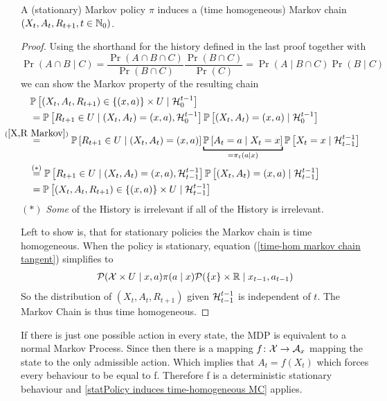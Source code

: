 \begin{prop}\label{statPolicy induces time-homogeneous MC}
	A (stationary) Markov  policy \(\pi\) induces a (time homogeneous) Markov chain \((X_t,A_t,R_{t+1},t\in\mathbb{N}_0)\).
\end{prop}
\begin{proof} 

	Using the shorthand for the history defined in the last proof together with 
	\[
		\Pr(A\cap B \mid C)
		=\frac{\Pr(A\cap B\cap C)}{\Pr(B\cap C)}\frac{\Pr(B\cap C)}{\Pr(C)} 
		= \Pr(A\mid B\cap C)\Pr(B\mid C) 
	\]
	we can show the Markov property of the resulting chain
	\begin{align}
		&\Pr\left[(X_t,A_t,R_{t+1})\in\{(x,a)\}\times U \mid \cH_0^{t-1} \right] \nonumber \\
		&=\Pr\left[R_{t+1}\in U \mid (X_t, A_t)=(x,a), \cH_0^{t-1}\right]
		\Pr\left[(X_t, A_t)=(x,a)\mid\cH_0^{t-1}\right]
		\nonumber\\
		&\lxeq{(\ref{X,R Markov})}\Pr\left[R_{t+1}\in U \mid (X_t, A_t)=(x,a)\right]
		\underbracket[1pt]{\Pr\left[A_t=a \mid X_t=x\right]}_{=\pi_t(a\mid x)}
		\Pr\left[X_t=x\mid \cH_{t-1}^{t-1}\right]
		\label{time-hom markov chain tangent}\\
		&\lxeq{(*)}\Pr\left[R_{t+1}\in U \mid (X_t, A_t)=(x,a), \cH_{t-1}^{t-1}\right]
		\Pr\left[(X_t, A_t)=(x,a)\mid\cH_{t-1}^{t-1}\right]
		\nonumber\\
		&=\Pr\left[(X_t,A_t,R_{t+1})\in\{(x,a)\}\times U \mid \cH_{t-1}^{t-1} \right]
		\nonumber
	\end{align}
	\((*)\) \emph{Some} of the History is irrelevant if all of the History is irrelevant. 
	
	Left to show is, that for stationary policies the Markov chain is time homogeneous. When the policy is stationary, equation (\ref{time-hom markov chain tangent}) simplifies to
	\begin{align*}
		\mathcal{P}(\mathcal{X}\times U \mid x,a)\pi(a\mid x)
		\mathcal{P}(\{x\}\times \mathbb{R} \mid x_{t-1}, a_{t-1})
	\end{align*}
	So the distribution of \((X_{t},A_{t},R_{t+1})\) given \(\mathcal{H}^{t-1}_{t-1}\) is independent of \(t\). The Markov Chain is thus time homogeneous.
\end{proof} 
\begin{remark} 
If there is just one possible action in every state, the MDP is equivalent to a normal Markov Process. 
Since then there is a mapping \(f\colon\mathcal{X}\to\mathcal{A}_x\) mapping the state to  the only admissible action. Which implies that \(A_t=f(X_t)\) which forces every behaviour to be equal to f. Therefore f is a deterministic stationary behaviour and \ref{statPolicy induces time-homogeneous MC} applies.  
\end{remark}

